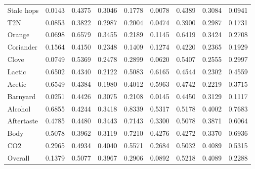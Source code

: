 {\begin{longtable}{lrrrrrrrr}
Stale hops & 0.0143 & 0.4375 & 0.3046 & 0.1778 & 0.0078 & 0.4389 & 0.3084 & 0.0941 \\
T2N & 0.0853 & 0.3822 & 0.2987 & 0.2004 & 0.0474 & 0.3900 & 0.2987 & 0.1731 \\
Orange & 0.0698 & 0.6579 & 0.3455 & 0.2189 & 0.1145 & 0.6419 & 0.3424 & 0.2708 \\
Coriander & 0.1564 & 0.4150 & 0.2348 & 0.1409 & 0.1274 & 0.4220 & 0.2365 & 0.1929 \\
Clove & 0.0749 & 0.5369 & 0.2478 & 0.2899 & 0.0620 & 0.5407 & 0.2555 & 0.2997 \\
Lactic & 0.6502 & 0.4340 & 0.2122 & 0.5083 & 0.6165 & 0.4544 & 0.2302 & 0.4559 \\
Acetic & 0.6549 & 0.4384 & 0.1980 & 0.4012 & 0.5963 & 0.4742 & 0.2219 & 0.3715 \\
Barnyard & 0.0251 & 0.4426 & 0.3075 & 0.2108 & 0.0145 & 0.4450 & 0.3129 & 0.1117 \\
Alcohol & 0.6855 & 0.4244 & 0.3418 & 0.8339 & 0.5317 & 0.5178 & 0.4002 & 0.7683 \\
Aftertaste & 0.4785 & 0.4480 & 0.3443 & 0.7143 & 0.3300 & 0.5078 & 0.3871 & 0.6064 \\
Body & 0.5078 & 0.3962 & 0.3119 & 0.7210 & 0.4276 & 0.4272 & 0.3370 & 0.6936 \\
CO2 & 0.2965 & 0.4934 & 0.4040 & 0.5571 & 0.2684 & 0.5032 & 0.4089 & 0.5315 \\
Overall & 0.1379 & 0.5077 & 0.3967 & 0.2906 & 0.0892 & 0.5218 & 0.4089 & 0.2288 \\
\end{longtable}
}
